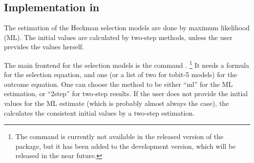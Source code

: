 \subsection[Implementation]{Implementation in }

The estimation of the Heckman selection models are done by maximum
likelihood (ML).  The initial values are calculated by two-step methods,
unless the user prevides the values herself.  

The main frontend for the selection models is the command
.%
\footnote{The command  is currently not available
in the released version of the  package,
but it has been added to the development version,
which will be released in the near future.}
It needs a formula for the selection equation, and
one (or a list of two for tobit-5 models) for the outcome equation.
One can choose the method to be either ``ml'' for the ML estimation,
or ``2step'' for two-step results.  If the user does not provide the
initial values for the ML estimate (which is probably almost always
the case), the  calculates the consistent initial
values by a two-step estimation.
